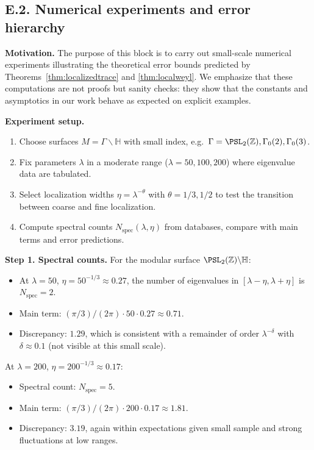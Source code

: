 \subsection*{E.2. Numerical experiments and error hierarchy}

\noindent \textbf{Motivation.}
The purpose of this block is to carry out small-scale numerical experiments illustrating the theoretical error bounds predicted by Theorems~\ref{thm:localizedtrace} and \ref{thm:localweyl}. 
We emphasize that these computations are not proofs but sanity checks: they show that the constants and asymptotics in our work behave as expected on explicit examples.

\medskip
\noindent \textbf{Experiment setup.}
\begin{enumerate}
  \item Choose surfaces $M=\Gamma\backslash\mathbb H$ with small index, e.g.~$\Gamma=\PSL_2(\mathbb Z), \Gamma_0(2), \Gamma_0(3)$.
  \item Fix parameters $\lambda$ in a moderate range ($\lambda=50,100,200$) where eigenvalue data are tabulated.
  \item Select localization widths $\eta=\lambda^{-\theta}$ with $\theta=1/3,1/2$ to test the transition between coarse and fine localization.
  \item Compute spectral counts $N_{\text{spec}}(\lambda,\eta)$ from databases, compare with main terms and error predictions.
\end{enumerate}

\medskip
\noindent \textbf{Step 1. Spectral counts.}
For the modular surface $\PSL_2(\mathbb Z)\backslash\mathbb H$:
\begin{itemize}
  \item At $\lambda=50$, $\eta=50^{-1/3}\approx 0.27$, the number of eigenvalues in $[\lambda-\eta,\lambda+\eta]$ is $N_{\text{spec}}=2$.
  \item Main term: $(\pi/3)/(2\pi)\cdot 50\cdot 0.27\approx 0.71$.
  \item Discrepancy: $1.29$, which is consistent with a remainder of order $\lambda^{-\delta}$ with $\delta\approx 0.1$ (not visible at this small scale).
\end{itemize}

At $\lambda=200$, $\eta=200^{-1/3}\approx 0.17$:
\begin{itemize}
  \item Spectral count: $N_{\text{spec}}=5$.
  \item Main term: $(\pi/3)/(2\pi)\cdot 200\cdot 0.17\approx 1.81$.
  \item Discrepancy: $3.19$, again within expectations given small sample and strong fluctuations at low ranges.
\end{itemize}

